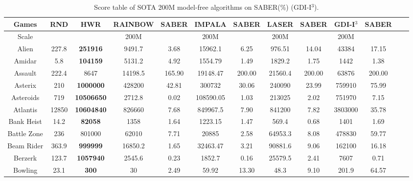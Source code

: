 \documentclass[nohyperref]{article}
\theoremstyle{plain}
\begin{document}
\begin{table}[!hb]
\footnotesize
\begin{center}
\caption{Score table of SOTA 200M model-free algorithms on SABER(\%)  (GDI-I$^3$).}
\setlength{\tabcolsep}{1.0pt}
\begin{tabular}{ |c |c |c| c c| c c|  c c |c c |c c |}
\hline
Games & RND & HWR & RAINBOW & SABER & IMPALA & SABER & LASER & SABER & GDI-I$^3$ & SABER \\
\hline
Scale  &     &       & 200M   &       &  200M    &        & 200M   & &  200M   & \\
\hline
 Alien              & 227.8     & \textbf{251916}    & 9491.7   &3.68    & 15962.1    & 6.25       & 976.51  & 14.04     &43384      &17.15   \\
 Amidar             & 5.8       & \textbf{104159}    & 5131.2   &4.92    & 1554.79    & 1.49       & 1829.2  & 1.75      &1442              &1.38           \\
 Assault            & 222.4     & 8647               & 14198.5  &165.90  & 19148.47   & 200.00     & 21560.4 & 200.00    &63876      &200.00   \\
 Asterix            & 210       & \textbf{1000000}   & 428200   &42.81   & 300732     & 30.06      & 240090  & 23.99     &759910     &75.99   \\
 Asteroids          & 719       & \textbf{10506650}  & 2712.8   &0.02    & 108590.05  & 1.03       & 213025  & 2.02      &751970     &7.15    \\
 Atlantis           & 12850     & \textbf{10604840}  & 826660   &7.68    & 849967.5   & 7.90       & 841200  & 7.82      &3803000    &35.78   \\
 Bank Heist         & 14.2      & \textbf{82058}     & 1358     &1.64    & 1223.15    & 1.47       & 569.4   & 0.68      &1401       &1.69     \\
 Battle Zone        & 236       &801000    & 62010    &7.71    & 20885      & 2.58       & 64953.3 & 8.08      &478830     &59.77    \\
 Beam Rider         & 363.9     & \textbf{999999}    & 16850.2  &1.65    & 32463.47   & 3.21       & 90881.6 & 9.06      &162100     &16.18    \\
 Berzerk            & 123.7     & \textbf{1057940}            & 2545.6   &0.23    & 1852.7     & 0.16       & 25579.5 & 2.41      &7607              &0.71              \\
 Bowling            & 23.1      & \textbf{300}       & 30       &2.49    & 59.92      & 13.30      & 48.3    & 9.10      &201.9      &64.57  \\

\end{tabular}
\end{center}
\end{table}
\end{document}
